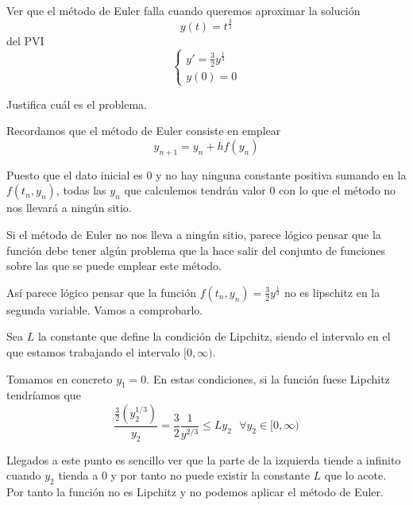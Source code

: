 \begin{problem}[2]
Ver que el método de Euler falla cuando queremos aproximar la solución
\[y(t) = t^{\frac{3}{2}}\]
del PVI
\[\left\{ \begin{array}{l}y'=\frac{3}{2}y^{\frac{1}{3}} \\
y(0)=0\end{array}
\right.\]

Justifica cuál es el problema.

\solution
{}

Recordamos que el método de Euler consiste en emplear
\[y_{n+1} = y_n + h f(y_n)\]

Puesto que el dato inicial es 0 y no hay ninguna constante positiva sumando en la $f(t_n,y_n)$, todas las $y_n$ que calculemos tendrán valor 0 con lo que el método no nos llevará a ningún sitio.

Si el método de Euler no nos lleva a ningún sitio, parece lógico pensar que la función debe tener algún problema que la hace salir del conjunto de funciones sobre las que se puede emplear este método.

Así parece lógico pensar que la función $f(t_n,y_n)=\frac{3}{2}y^{\frac{1}{3}}$ no es lipschitz en la segunda variable. Vamos a comprobarlo.

Sea $L$ la constante que define la condición de Lipchitz, siendo el intervalo en el que estamos trabajando el intervalo $[0, \infty)$.

Tomamos en concreto $y_1=0$. En estas condiciones, si la función fuese Lipchitz tendríamos que
\[\frac{\frac{3}{2}(y_2^{1/3})}{y_2} = \frac{3}{2}\frac{1}{y^{2/3}}\leq L y_2 \ \ \ \forall y_2 \in [0,\infty)\]

Llegados a este punto es sencillo ver que la parte de la izquierda tiende a infinito cuando $y_2$ tienda a 0 y por tanto no puede existir la constante $L$ que lo acote. Por tanto la función no es Lipchitz y no podemos aplicar el método de Euler.
\end{problem}

